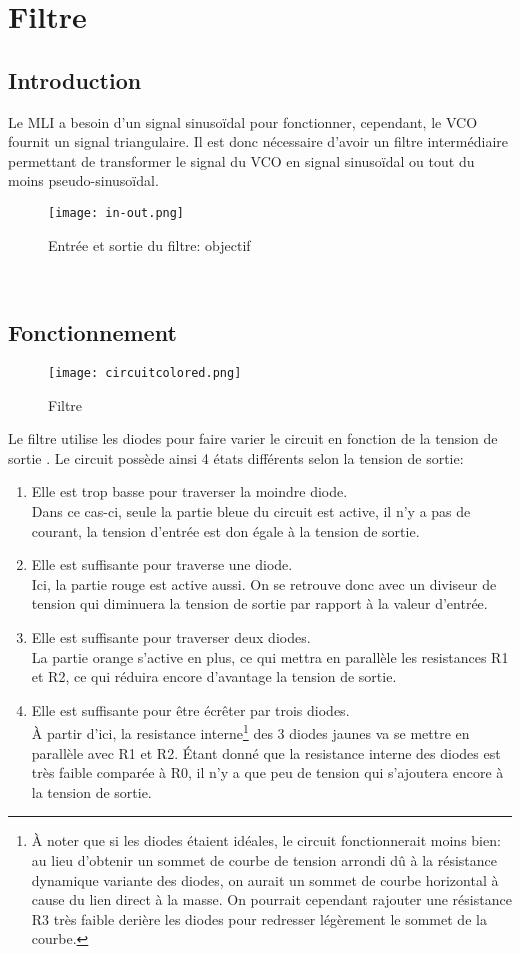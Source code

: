 

\section{Filtre\\}

\subsection{Introduction}
Le MLI a besoin d'un signal sinusoïdal pour fonctionner, cependant, le VCO fournit un signal triangulaire. Il est donc nécessaire d'avoir un filtre intermédiaire permettant de transformer le signal du VCO en signal sinusoïdal ou tout du moins pseudo-sinusoïdal.\\
\begin{figure}[h]
\centering
\texttt{[image: in-out.png]}
\caption{Entrée et sortie du filtre: objectif}
\end{figure}\\
\subsection{Fonctionnement}
\begin{figure}[h]
\centering
\texttt{[image: circuitcolored.png]}
\caption{Filtre}
\end{figure}
Le filtre utilise les diodes pour faire varier le circuit en fonction de la tension de sortie . Le circuit possède ainsi 4 états différents selon la tension de sortie:
\begin{enumerate}
\item Elle est trop basse pour traverser la moindre diode.\\
Dans ce cas-ci, seule la partie bleue du circuit est active, il n'y a pas de courant, la tension d'entrée est don égale à la tension de sortie.
\item Elle est suffisante pour traverse une diode.\\
Ici, la partie rouge est active aussi. On se retrouve donc avec un diviseur de tension qui diminuera la  tension de sortie par rapport à la valeur d'entrée.
\item Elle est suffisante pour traverser deux diodes.\\
La partie orange s'active en plus, ce qui mettra en parallèle les resistances R1 et R2, ce qui réduira encore d'avantage la tension de sortie.
\item Elle est suffisante pour être écrêter par trois diodes.\\
À partir d'ici, la resistance interne\footnote{À noter que si les diodes étaient idéales, le circuit fonctionnerait moins bien: au lieu d'obtenir un sommet de courbe de tension arrondi dû à la résistance dynamique variante des diodes, on aurait un sommet de courbe horizontal à cause du lien direct à la masse. On pourrait cependant rajouter une résistance R3 très faible derière les diodes pour redresser légèrement le sommet de la courbe.} des 3 diodes jaunes va se mettre en parallèle avec R1 et R2. Étant donné que la resistance interne des diodes est très faible comparée à R0, il n'y a que peu de tension qui s'ajoutera encore à la tension de sortie.
\end{enumerate}
